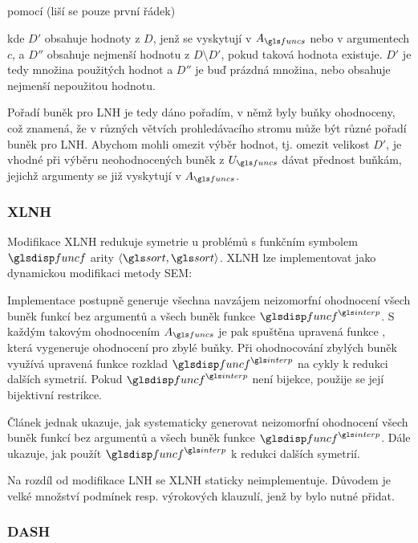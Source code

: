 \noindent pomocí (liší se pouze první řádek)

\medskip
\begin{algorithmic}
    \State {}
  \EndFor
\end{algorithmic}
\medskip

\noindent
kde $D'$ obsahuje hodnoty z $D$, jenž se vyskytují v $A_\funcs$ nebo
v argumentech $c$,
a $D''$ obsahuje nejmenší hodnotu z $D \setminus D'$,
pokud taková hodnota existuje.
$D'$ je tedy množina použitých hodnot a $D''$ je buď prázdná množina,
nebo obsahuje nejmenší nepoužitou hodnotu.

Pořadí buněk pro LNH je tedy dáno pořadím, v němž byly
buňky ohodnoceny, což znamená, že v různých větvích
prohledávacího stromu může být různé pořadí buněk pro LNH.
Abychom mohli omezit výběr hodnot, tj. omezit velikost $D'$,
je vhodné při výběru neohodnocených buněk z $U_\funcs$
dávat přednost buňkám, jejichž argumenty se již vyskytují v $A_\funcs$.


\subsubsection{XLNH}

Modifikace XLNH \cite{xlnh} redukuje symetrie u problémů
s funkčním symbolem $\func$ arity $\langle \sort, \sort \rangle$.
XLNH lze implementovat jako dynamickou modifikaci metody SEM:

Implementace postupně generuje všechna navzájem
neizomorfní ohodnocení všech buněk
funkcí bez argumentů a všech buněk funkce $\func^\interp$.
S každým takovým ohodnocením $A_\funcs$ je pak spuštěna upravená funkce
, která vygeneruje ohodnocení pro zbylé buňky.
Při ohodnocování zbylých buněk využívá upravená funkce 
rozklad $\func^\interp$ na cykly
k redukci dalších symetrií. Pokud $\func^\interp$ není bijekce,
použije se její bijektivní restrikce.

Článek \cite{xlnh} jednak ukazuje, jak systematicky
generovat neizomorfní ohodnocení všech buněk
funkcí bez argumentů a všech buněk funkce $\func^\interp$.
Dále ukazuje, jak použít $\func^\interp$ k redukci dalších symetrií.

Na rozdíl od modifikace LNH se XLNH staticky neimplementuje.
Důvodem je velké množství podmínek resp. výrokových klauzulí,
jenž by bylo nutné přidat.

\subsubsection{DASH}

